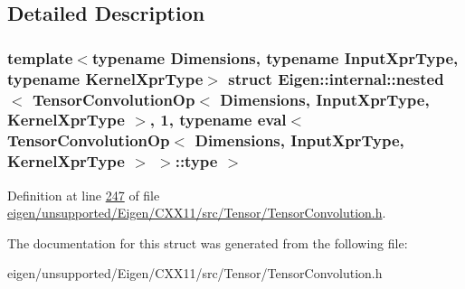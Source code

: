 \subsection{Detailed Description}
\subsubsection*{template$<$typename Dimensions, typename Input\+Xpr\+Type, typename Kernel\+Xpr\+Type$>$\newline
struct Eigen\+::internal\+::nested$<$ Tensor\+Convolution\+Op$<$ Dimensions, Input\+Xpr\+Type, Kernel\+Xpr\+Type $>$, 1, typename eval$<$ Tensor\+Convolution\+Op$<$ Dimensions, Input\+Xpr\+Type, Kernel\+Xpr\+Type $>$ $>$\+::type $>$}



Definition at line \hyperlink{eigen_2unsupported_2_eigen_2_c_x_x11_2src_2_tensor_2_tensor_convolution_8h_source_l00247}{247} of file \hyperlink{eigen_2unsupported_2_eigen_2_c_x_x11_2src_2_tensor_2_tensor_convolution_8h_source}{eigen/unsupported/\+Eigen/\+C\+X\+X11/src/\+Tensor/\+Tensor\+Convolution.\+h}.



The documentation for this struct was generated from the following file\+:\begin{DoxyCompactItemize}
\item 
eigen/unsupported/\+Eigen/\+C\+X\+X11/src/\+Tensor/\+Tensor\+Convolution.\+h\end{DoxyCompactItemize}
